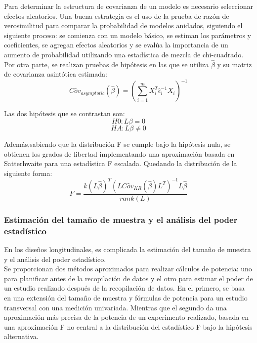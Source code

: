 	Para determinar la estructura de covarianza de un modelo es necesario seleccionar efectos aleatorios. Una buena estrategia es el uso de la prueba de razón de verosimilitud para comparar la probabilidad de modelos anidados, siguiendo el siguiente proceso: se comienza con un modelo básico, se estiman los parámetros y coeficientes, se agregan efectos aleatorios y se evalúa la importancia de un aumento de probabilidad utilizando una estadística de mezcla de chi-cuadrado.\\
	
	Por otra parte, se realizan pruebas de hipótesis en las que se utiliza $\hat{\beta}$ y su matriz de covarianza asintótica estimada:
	\begin{equation}
		C \hat{o} v_{asymptotic}(\hat{\beta})=(\sum_{i=1}^{m}X_{i}^{T} \hat{\epsilon}_{i}^{-1}X_{i})^{-1}
	\end{equation}
	
	Las dos hipótesis que se contrastan son:
	\begin{equation}
		H0: L \beta = 0
	\end{equation}
	\begin{equation}
		HA: L \beta \neq 0
	\end{equation}
	
	Además,sabiendo que la distribución F se cumple bajo la hipótesis nula, se obtienen los grados de libertad implementando una aproximación basada en Satterhwaite para una estadística F escalada. Quedando la distribución de la siguiente forma:
	\begin{equation}
		F=\frac{\mathit{k}(L\hat{\beta})^{T}(LC\hat{o}v_{KR}(\hat{\beta})L^{T})^{-1}L\hat{\beta}}{rank(L)}
	\end{equation}
	
	
	
	\subsubsection{Estimación del tamaño de muestra y el análisis del poder estadístico}
	
	En los diseños longitudinales, es complicada la estimación del tamaño de muestra y el análisis del poder estadístico. \\
	
	Se proporcionan dos métodos aproximados para realizar cálculos de potencia: uno para planificar antes de la recopilación de datos y el otro para estimar el poder de un estudio realizado después de la recopilación de datos. En el primero, se basa en una extensión del tamaño de muestra y fórmulas de potencia para un estudio transversal con una medición univariada. Mientras que el segundo da una aproximación más precisa de la potencia de un experimento realizado, basada en una aproximación F no central a la distribución del estadístico F bajo la hipótesis alternativa. 
	
